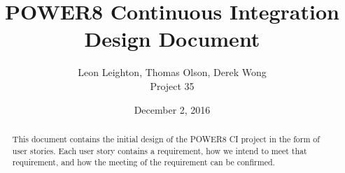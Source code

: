 \documentclass[10pt,letterpaper,onecolumn,journal]{IEEEtran}
\begin{document}
\begin{titlepage}
  \title{POWER8 Continuous Integration\\ Design Document}
  \author{Leon Leighton, Thomas Olson, Derek Wong\\Project 35}
  \date{December 2, 2016}
  \maketitle
  \vspace{4cm}
  \begin{abstract}
  \noindent This document contains the initial design of the POWER8 CI project in the form of user stories.
    Each user story contains a requirement, how we intend to meet that requirement, and how the meeting of the requirement can be confirmed.
  \end{abstract}
\end{titlepage}

\tableofcontents
\clearpage
\end{document}
